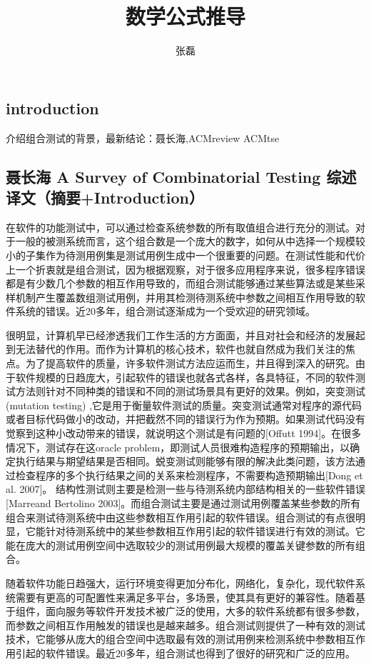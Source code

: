 \documentclass[10pt,journal,letterpaper,compsoc]{IEEEtran}
\date{}
\begin{document}
\begin{CJK}{UTF8}{gkai}

\title{数学公式推导}
\author{张磊}
\maketitle

\section{introduction}
介绍组合测试的背景，最新结论：聂长海,ACMreview ACMtse
	\subsection{聂长海 A Survey of Combinatorial Testing 综述译文（摘要+Introduction）}
在软件的功能测试中，可以通过检查系统参数的所有取值组合进行充分的测试。对于一般的被测系统而言，这个组合数是一个庞大的数字，如何从中选择一个规模较小的子集作为待测用例集是测试用例生成中一个很重要的问题。在测试性能和代价上一个折衷就是组合测试，因为根据观察，对于很多应用程序来说，很多程序错误都是有少数几个参数的相互作用导致的，而组合测试能够通过某些算法或是某些采样机制产生覆盖数组测试用例，并用其检测待测系统中参数之间相互作用导致的软件系统的错误。近20多年，组合测试逐渐成为一个受欢迎的研究领域。

很明显，计算机早已经渗透我们工作生活的方方面面，并且对社会和经济的发展起到无法替代的作用。而作为计算机的核心技术，软件也就自然成为我们关注的焦点。为了提高软件的质量，许多软件测试方法应运而生，并且得到深入的研究。由于软件规模的日趋庞大，引起软件的错误也就各式各样，各具特征，不同的软件测试方法则针对不同种类的错误和不同的测试场景具有更好的效果。例如，突变测试(mutation testing) ,它是用于衡量软件测试的质量。突变测试通常对程序的源代码或者目标代码做小的改动，并把截然不同的错误行为作为预期。如果测试代码没有觉察到这种小改动带来的错误，就说明这个测试是有问题的[Offutt 1994]。在很多情况下，测试存在这oracle problem，即测试人员很难构造程序的预期输出，以确定执行结果与期望结果是否相同。蜕变测试则能够有限的解决此类问题，该方法通过检查程序的多个执行结果之间的关系来检测程序，不需要构造预期输出[Dong et al. 2007]。 结构性测试则主要是检测一些与待测系统内部结构相关的一些软件错误[Marreand Bertolino 2003]。而组合测试主要是通过测试用例覆盖某些参数的所有组合来测试待测系统中由这些参数相互作用引起的软件错误。组合测试的有点很明显，它能针对待测系统中的某些参数相互作用引起的软件错误进行有效的测试。它能在庞大的测试用例空间中选取较少的测试用例最大规模的覆盖关键参数的所有组合。

随着软件功能日趋强大，运行环境变得更加分布化，网络化，复杂化，现代软件系统需要有更高的可配置性来满足多平台，多场景，使其具有更好的兼容性。随着基于组件，面向服务等软件开发技术被广泛的使用，大多的软件系统都有很多参数，而参数之间相互作用触发的错误也是越来越多。组合测试则提供了一种有效的测试技术，它能够从庞大的组合空间中选取最有效的测试用例来检测系统中参数相互作用引起的软件错误。最近20多年，组合测试也得到了很好的研究和广泛的应用。


\end{CJK}
\end{document}
